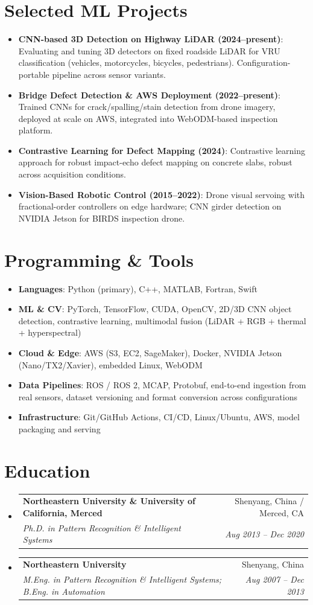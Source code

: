 \documentclass[letterpaper,10pt]{article}
\makeatletter
\newcommand{\resumeItem}[2]{
  \item\small{
    \textbf{#1}{: #2 \vspace{-2pt}}
  }
}
\newcommand{\resumeSubheading}[4]{
  \vspace{-1pt}\item
    \begin{tabular*}{0.97\textwidth}{l@{\extracolsep{\fill}}r}
      \textbf{#1} & #2 \\
      \textit{\small#3} & \textit{\small #4} \\
    \end{tabular*}\vspace{-5pt}
}
\newcommand{\resumeSubHeadingListStart}{\begin{itemize}[leftmargin=*]}
\newcommand{\resumeSubHeadingListEnd}{\end{itemize}}
\makeatother
\begin{document}
\section{Selected ML Projects}
  \resumeSubHeadingListStart
    \resumeItem{CNN-based 3D Detection on Highway LiDAR (2024--present)}{Evaluating and tuning 3D detectors on fixed roadside LiDAR for VRU classification (vehicles, motorcycles, bicycles, pedestrians). Configuration-portable pipeline across sensor variants.}
    \resumeItem{Bridge Defect Detection \& AWS Deployment (2022--present)}{Trained CNNs for crack/spalling/stain detection from drone imagery, deployed at scale on AWS, integrated into WebODM-based inspection platform.}
    \resumeItem{Contrastive Learning for Defect Mapping (2024)}{Contrastive learning approach for robust impact-echo defect mapping on concrete slabs, robust across acquisition conditions.}
    \resumeItem{Vision-Based Robotic Control (2015--2022)}{Drone visual servoing with fractional-order controllers on edge hardware; CNN girder detection on NVIDIA Jetson for BIRDS inspection drone.}
  \resumeSubHeadingListEnd

\section{Programming \& Tools}
  \resumeSubHeadingListStart
    \item\small{\textbf{Languages}: Python (primary), C++, MATLAB, Fortran, Swift}
    \item\small{\textbf{ML \& CV}: PyTorch, TensorFlow, CUDA, OpenCV, 2D/3D CNN object detection, contrastive learning, multimodal fusion (LiDAR + RGB + thermal + hyperspectral)}
    \item\small{\textbf{Cloud \& Edge}: AWS (S3, EC2, SageMaker), Docker, NVIDIA Jetson (Nano/TX2/Xavier), embedded Linux, WebODM}
    \item\small{\textbf{Data Pipelines}: ROS / ROS 2, MCAP, Protobuf, end-to-end ingestion from real sensors, dataset versioning and format conversion across configurations}
    \item\small{\textbf{Infrastructure}: Git/GitHub Actions, CI/CD, Linux/Ubuntu, AWS, model packaging and serving}
  \resumeSubHeadingListEnd

\section{Education}
  \resumeSubHeadingListStart
    \resumeSubheading
      {Northeastern University \& University of California, Merced}{Shenyang, China / Merced, CA}
      {Ph.D. in Pattern Recognition \& Intelligent Systems}{Aug 2013 -- Dec 2020}
    \resumeSubheading
      {Northeastern University}{Shenyang, China}
      {M.Eng. in Pattern Recognition \& Intelligent Systems; B.Eng. in Automation}{Aug 2007 -- Dec 2013}
  \resumeSubHeadingListEnd
\end{document}
